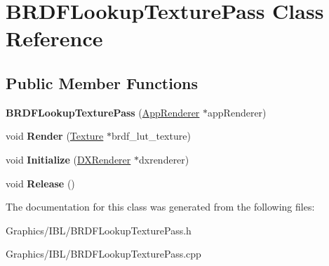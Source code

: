 \hypertarget{classBRDFLookupTexturePass}{}\section{B\+R\+D\+F\+Lookup\+Texture\+Pass Class Reference}
\label{classBRDFLookupTexturePass}
\subsection*{Public Member Functions}
\begin{DoxyCompactItemize}
\item 
\mbox{\label{classBRDFLookupTexturePass_a0b442fac37fde6e275f40df0eb1e0fc6}} 
{\bfseries B\+R\+D\+F\+Lookup\+Texture\+Pass} (\hyperlink{classAppRenderer}{App\+Renderer} $\ast$app\+Renderer)
\item 
\mbox{\label{classBRDFLookupTexturePass_a54e0d191bd57d642ff039ed60521da6f}} 
void {\bfseries Render} (\hyperlink{classTexture}{Texture} $\ast$brdf\+\_\+lut\+\_\+texture)
\item 
\mbox{\label{classBRDFLookupTexturePass_a2449e85dba714e6305b68973d2a4105a}} 
void {\bfseries Initialize} (\hyperlink{classDXRenderer}{D\+X\+Renderer} $\ast$dxrenderer)
\item 
\mbox{\label{classBRDFLookupTexturePass_a8a20b058ccfcf92afab17f199a74e2a1}} 
void {\bfseries Release} ()
\end{DoxyCompactItemize}


The documentation for this class was generated from the following files\+:\begin{DoxyCompactItemize}
\item 
Graphics/\+I\+B\+L/B\+R\+D\+F\+Lookup\+Texture\+Pass.\+h\item 
Graphics/\+I\+B\+L/B\+R\+D\+F\+Lookup\+Texture\+Pass.\+cpp\end{DoxyCompactItemize}
